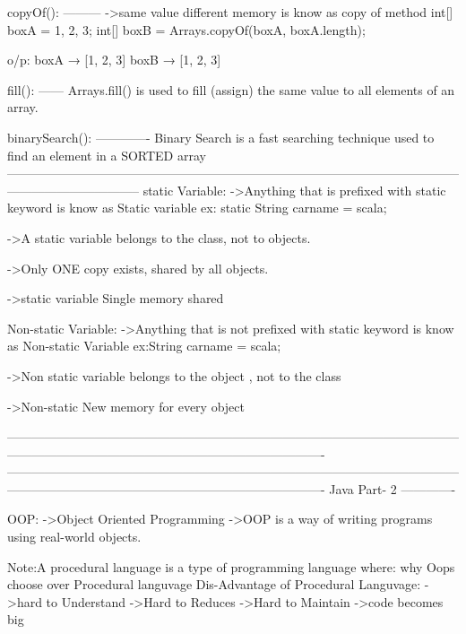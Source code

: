             copyOf():
            ---------
                ->same value different memory is know as copy of method
                int[] boxA = {1, 2, 3};
                int[] boxB = Arrays.copyOf(boxA, boxA.length);

                o/p:
                  boxA → [1, 2, 3]
                  boxB → [1, 2, 3]

             fill():
             ------
                Arrays.fill() is used to fill (assign) the same value to all elements of an array.

            binarySearch():
            -------------
                 Binary Search is a fast searching technique used to find an element in a SORTED array
--------------------------------------------------------------------------------------------------------------------------------------------
static Variable:
            ->Anything that is prefixed with static keyword is know as Static variable
               ex: static String carname = scala;

            ->A static variable belongs to the class, not to objects.

            ->Only ONE copy exists, shared by all objects.

            ->static variable Single memory shared

Non-static Variable:
            ->Anything that is not prefixed with static keyword is know as Non-static Variable
            ex:String carname = scala;
           
            ->Non static variable belongs to the object , not to the class

            ->Non-static New memory for every object








----------------------------------------------------------------------------------------------------------------------------------------------------------------------------------------
----------------------------------------------------------------------------------------------------------------------------------------------------------------------------------------
                                               Java Part- 2
                                               -------------

OOP:
    ->Object Oriented Programming
    ->OOP is a way of writing programs using real-world objects.


Note:A procedural language is a type of programming language where:
why Oops choose over Procedural languvage
Dis-Advantage of Procedural Languvage:
   ->hard to Understand
   ->Hard to Reduces
   ->Hard to Maintain
   ->code becomes big

